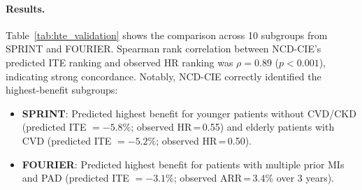 \documentclass[runningheads]{llncs}
\begin{document}
\paragraph{Results.}
Table~\ref{tab:hte_validation} shows the comparison across 10
subgroups from SPRINT and FOURIER.
Spearman rank correlation between NCD-CIE's predicted ITE ranking
and observed HR ranking was $\rho = 0.89$ ($p < 0.001$), indicating
strong concordance.
Notably, NCD-CIE correctly identified the highest-benefit subgroups:
\begin{itemize}
\item \textbf{SPRINT}: Predicted highest benefit for younger
  patients without CVD/CKD (predicted ITE $= -5.8\%$; observed
  HR\,=\,0.55) and elderly patients with CVD (predicted ITE $= -5.2\%$;
  observed HR\,=\,0.50).
\item \textbf{FOURIER}: Predicted highest benefit for patients with
  multiple prior MIs and PAD (predicted ITE $= -3.1\%$; observed
  ARR\,=\,3.4\% over 3 years).
\end{itemize}
\end{document}
